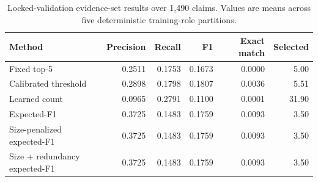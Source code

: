 \begin{table}[t]
\centering
\caption{Locked-validation evidence-set results over 1,490 claims. Values are means across five deterministic training-role partitions.}
\label{tab:selector-means}
\begin{tabular}{lrrrrr}
\toprule
Method & Precision & Recall & F1 & Exact match & Selected \\
\midrule
Fixed top-5 & 0.2511 & 0.1753 & 0.1673 & 0.0000 & 5.00 \\
Calibrated threshold & 0.2898 & 0.1798 & 0.1807 & 0.0036 & 5.51 \\
Learned count & 0.0965 & 0.2791 & 0.1100 & 0.0001 & 31.90 \\
Expected-F1 & 0.3725 & 0.1483 & 0.1759 & 0.0093 & 3.50 \\
Size-penalized expected-F1 & 0.3725 & 0.1483 & 0.1759 & 0.0093 & 3.50 \\
Size + redundancy expected-F1 & 0.3725 & 0.1483 & 0.1759 & 0.0093 & 3.50 \\
\bottomrule
\end{tabular}
\end{table}
